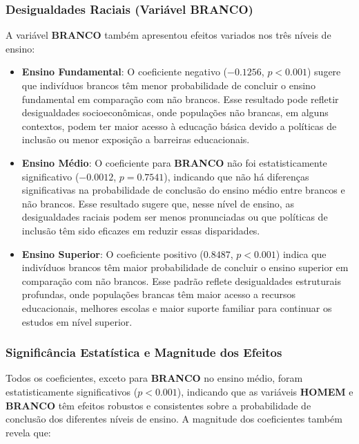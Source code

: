 \documentclass[a4paper,12pt]{article}
\begin{document}
\subsubsection{Desigualdades Raciais (Variável BRANCO)}

A variável \textbf{BRANCO} também apresentou efeitos variados nos três níveis de ensino:

\begin{itemize}
    \item \textbf{Ensino Fundamental}: O coeficiente negativo (\(-0.1256\), \(p < 0.001\)) sugere que indivíduos brancos têm menor probabilidade de concluir o ensino fundamental em comparação com não brancos. Esse resultado pode refletir desigualdades socioeconômicas, onde populações não brancas, em alguns contextos, podem ter maior acesso à educação básica devido a políticas de inclusão ou menor exposição a barreiras educacionais.
    
    \item \textbf{Ensino Médio}: O coeficiente para \textbf{BRANCO} não foi estatisticamente significativo (\(-0.0012\), \(p = 0.7541\)), indicando que não há diferenças significativas na probabilidade de conclusão do ensino médio entre brancos e não brancos. Esse resultado sugere que, nesse nível de ensino, as desigualdades raciais podem ser menos pronunciadas ou que políticas de inclusão têm sido eficazes em reduzir essas disparidades.
    
    \item \textbf{Ensino Superior}: O coeficiente positivo (\(0.8487\), \(p < 0.001\)) indica que indivíduos brancos têm maior probabilidade de concluir o ensino superior em comparação com não brancos. Esse padrão reflete desigualdades estruturais profundas, onde populações brancas têm maior acesso a recursos educacionais, melhores escolas e maior suporte familiar para continuar os estudos em nível superior.
\end{itemize}

\subsubsection{Significância Estatística e Magnitude dos Efeitos}

Todos os coeficientes, exceto para \textbf{BRANCO} no ensino médio, foram estatisticamente significativos (\(p < 0.001\)), indicando que as variáveis \textbf{HOMEM} e \textbf{BRANCO} têm efeitos robustos e consistentes sobre a probabilidade de conclusão dos diferentes níveis de ensino. A magnitude dos coeficientes também revela que:
\end{document}
